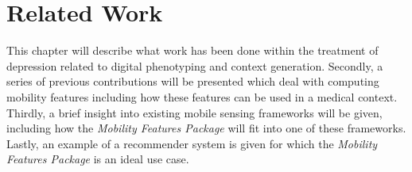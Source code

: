 \chapter{Related Work}
\label{chapter:02-related-work}
This chapter will describe what work has been done within the treatment of depression related to digital phenotyping and context generation. Secondly, a series of previous contributions will be presented which deal with computing mobility features including how these features can be used in a medical context. Thirdly, a brief insight into existing mobile sensing frameworks will be given, including how the \textit{Mobility Features Package} will fit into one of these frameworks. Lastly, an example of a recommender system is given for which the \textit{Mobility Features Package} is an ideal use case.











